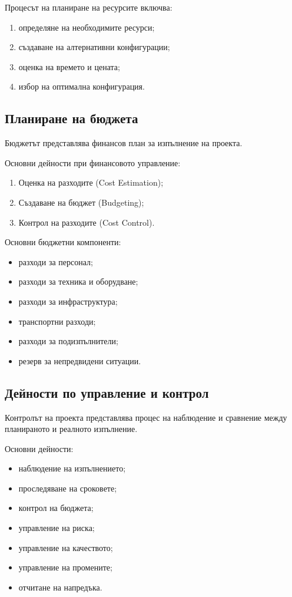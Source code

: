 \documentclass{scrartcl}
\begin{document}
\begin{FlushLeft}
Процесът на планиране на ресурсите включва:

\begin{enumerate}
    \item определяне на необходимите ресурси;
    \item създаване на алтернативни конфигурации;
    \item оценка на времето и цената;
    \item избор на оптимална конфигурация.
\end{enumerate}

\subsection{Планиране на бюджета}

Бюджетът представлява финансов план за изпълнение на проекта.

Основни дейности при финансовото управление:

\begin{enumerate}
    \item Оценка на разходите (Cost Estimation);
    \item Създаване на бюджет (Budgeting);
    \item Контрол на разходите (Cost Control).
\end{enumerate}

Основни бюджетни компоненти:

\begin{itemize}
    \item разходи за персонал;
    \item разходи за техника и оборудване;
    \item разходи за инфраструктура;
    \item транспортни разходи;
    \item разходи за подизпълнители;
    \item резерв за непредвидени ситуации.
\end{itemize}

\subsection{Дейности по управление и контрол}

Контролът на проекта представлява процес на наблюдение и сравнение между планираното и реалното изпълнение.

Основни дейности:

\begin{itemize}
    \item наблюдение на изпълнението;
    \item проследяване на сроковете;
    \item контрол на бюджета;
    \item управление на риска;
    \item управление на качеството;
    \item управление на промените;
    \item отчитане на напредъка.
\end{itemize}


\end{FlushLeft}
\end{document}
